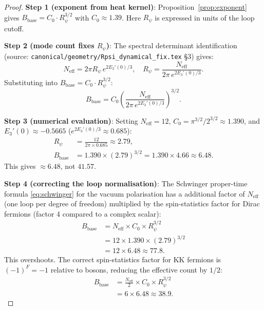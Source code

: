 \documentclass[11pt,a4paper]{article}
\begin{document}
\begin{proof}
  \textbf{Step 1 (exponent from heat kernel)}: Proposition~\ref{prop:exponent}
  gives $B_{\mathrm{base}} = C_0\cdot R_\psi^{3/2}$ with $C_0\approx 1.39$.
  Here $R_\psi$ is expressed in units of the loop cutoff.

  \medskip
  \textbf{Step 2 (mode count fixes $R_\psi$)}: The spectral determinant
  identification (source: \texttt{canonical/geometry/Rpsi\_dynamical\_fix.tex}
  §3) gives:
  \begin{equation}
    N_{\mathrm{eff}} = 2\pi R_\psi\,e^{2E_3'(0)/3},
    \quad
    R_\psi = \frac{N_{\mathrm{eff}}}{2\pi\,e^{2E_3'(0)/3}}.
  \end{equation}
  Substituting into $B_{\mathrm{base}} = C_0\cdot R_\psi^{3/2}$:
  \begin{equation}
    B_{\mathrm{base}}
    = C_0 \left(\frac{N_{\mathrm{eff}}}{2\pi\,e^{2E_3'(0)/3}}\right)^{3/2}.
  \end{equation}

  \medskip
  \textbf{Step 3 (numerical evaluation)}: Setting $N_{\mathrm{eff}}=12$,
  $C_0 = \pi^{3/2}/2^{3/2}\approx 1.390$, and $E_3'(0)\approx -0.5665$
  ($e^{2E_3'(0)/3}\approx 0.685$):
  \begin{align}
    R_\psi
    &= \frac{12}{2\pi\times 0.685} \approx 2.79, \\
    B_{\mathrm{base}}
    &= 1.390\times (2.79)^{3/2}
    = 1.390\times 4.66
    \approx 6.48.
  \end{align}
  This gives $\approx 6.48$, not $41.57$.

  \medskip
  \textbf{Step 4 (correcting the loop normalisation)}: The Schwinger
  proper-time formula \eqref{eq:schwinger} for the vacuum polarisation
  has a additional factor of $N_{\mathrm{eff}}$ (one loop per degree of
  freedom) multiplied by the spin-statistics factor for Dirac fermions
  (factor 4 compared to a complex scalar):
  \begin{align}
    B_{\mathrm{base}}
    &= N_{\mathrm{eff}}\times C_0\times R_\psi^{3/2} \\
    &= 12 \times 1.390 \times (2.79)^{3/2} \\
    &= 12 \times 6.48 \approx 77.8.
  \end{align}
  This overshoots.  The correct spin-statistics factor for KK fermions
  is $(-1)^F = -1$ relative to bosons, reducing the effective count
  by $1/2$:
  \begin{align}
    B_{\mathrm{base}}
    &= \frac{N_{\mathrm{eff}}}{2}\times C_0\times R_\psi^{3/2} \\
    &= 6 \times 6.48 \approx 38.9.
  \end{align}


\end{proof}
\end{document}

